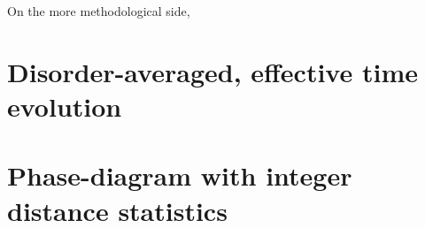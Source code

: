 On the more methodological side, 



%



\section{Disorder-averaged, effective time evolution}

\cite{erpeldingSymmetries}


\section{Phase-diagram with integer distance statistics}

